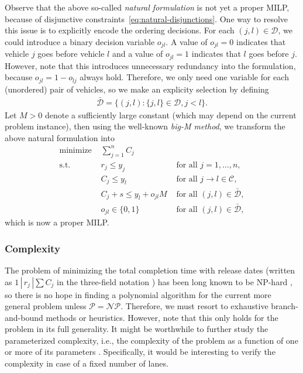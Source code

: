 \documentclass{article}
\theoremstyle{definition}
\theoremstyle{plain}
\begin{document}
Observe that the above so-called \textit{natural formulation} is not yet a
proper MILP, because of disjunctive constraints~\eqref{eq:natural-disjunctions}.
One way to resolve this issue is to explicitly encode the ordering decisions.
For each $(j,l) \in \mathcal{D}$, we could introduce a binary decision variable
$o_{jl}$. A value of $o_{jl} = 0$ indicates that vehicle $j$ goes before vehicle
$l$ and a value of $o_{jl} = 1$ indicates that $l$ goes before $j$. However,
note that this introduces unnecessary redundancy into the formulation, because
$o_{jl} = 1 - o_{lj}$ always hold. Therefore, we only need one variable for each
(unordered) pair of vehicles, so we make an explicity selection by defining
\begin{align}
  \bar{\mathcal{D}} = \{ (j,l) : \{ j,l \} \in \mathcal{D}, j < l \}.
\end{align}
Let
$M > 0$ denote a sufficiently large constant (which may depend on the current
problem instance), then using the well-known \textit{big-M method}, we transform
the above natural formulation into
%
\begin{subequations}
\begin{align}
  \text{minimize } & \sum_{j=1}^{n} C_{j} & \\
  \text{s.t. } & r_{j} \leq y_{j} & \text{ for all } j=1, \dots, n, \\
              & C_{j} \leq y_{l} & \text{ for all } j \rightarrow l \in \mathcal{C}, \\
              & C_{j} + s \leq y_{l} + o_{jl}M  & \text{ for all } (j,l) \in \bar{\mathcal{D}}, \label{eq:disjunctive-constraints} \\
              & o_{jl} \in \{ 0, 1 \} & \text{ for all } (j,l) \in \bar{\mathcal{D}} ,
\end{align}
\end{subequations}
which is now a proper MILP.

\subsubsection{Complexity}
The problem of minimizing the total completion time with release dates (written
as $1 \, | \, r_{j} \, | \sum C_{j}$ in the three-field notation
\cite{grahamOptimizationApproximationDeterministic1979}) has been long known to
be NP-hard \cite{lenstraComplexityMachineScheduling1977}, so there is no hope in
finding a polynomial algorithm for the current more general problem unless
$\mathcal{P} = \mathcal{NP}$. Therefore, we must resort to exhaustive
branch-and-bound methods or heuristics. However, note that this only holds for
the problem in its full generality. It might be worthwhile to further study the
parameterized complexity, i.e., the complexity of the problem as a function of
one or more of its parameters \cite{cyganParameterizedAlgorithms2015}.
Specifically, it would be interesting to verify the complexity in case of a
fixed number of lanes.
\end{document}

